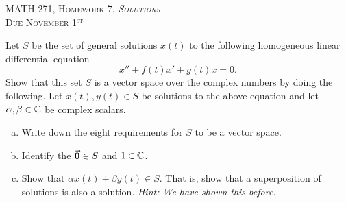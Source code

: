 \documentclass[12pt]{article} %
\begin{document}
\begin{center}
   \textsc{\large MATH 271, Homework 7, \emph{Solutions}}\\
   \textsc{Due November 1$^\textrm{st}$}
\end{center}
\vspace{.5cm}

\begin{problem}
Let $S$ be the set of general solutions $x(t)$ to the following homogeneous linear differential equation 
\[
x''+f(t)x'+g(t)x=0.
\]
Show that this set $S$ is a vector space over the complex numbers by doing the following. Let $x(t),y(t) \in S$ be solutions to the above equation and let $\alpha, \beta \in \mathbb{C}$ be complex scalars.
\begin{enumerate}[(a)]
    \item Write down the eight requirements for $S$ to be a vector space.  
    \item Identify the $\boldsymbol{\vec{0}} \in S$ and $1\in \mathbb{C}$. 
    \item Show that $\alpha x(t) + \beta y(t) \in S$. That is, show that a superposition of solutions is also a solution. \emph{Hint: We have shown this before.}
\end{enumerate}
\end{problem}
\end{document}
